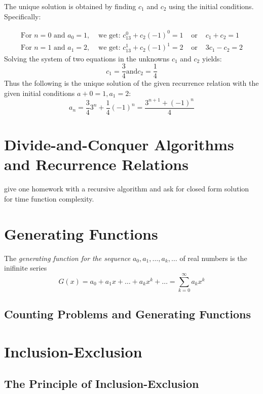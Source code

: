   The unique solution is obtained by finding $c_1$ and $c_2$ using the initial conditions. Specifically:
 
  \begin{align*}
  \text{For } n=0 \text{ and } a_0=1,  &\text{ we get: }  c_13^0+c_2(-1)^0=1   &\text{ or }  & c_1+c_2=1\\
  \text{For } n=1 \text{ and } a_1=2,  &\text{ we get: }  c_13^1+c_2(-1)^1=2   &\text{ or } & 3c_1-c_2=2
 \end{align*}  
 Solving the system of two equations in the unknowns $c_1$ and $c_2$ yields:
 \begin{displaymath}  
 c_1=\frac{3}{4} \text{and} c_2=\frac{1}{4}
 \end{displaymath}
 Thus the following is the unique solution of the given recurrence relation with the given initial conditions $a+0=1,a_1=2$:
 \begin{displaymath}
 a_n=\frac{3}{4} 3^n + \frac{1}{4} (-1)^n = \frac{3^{n+1}+(-1)^n}{4}
 \end{displaymath}

\section {Divide-and-Conquer Algorithms and Recurrence Relations}
give one homework with a recursive algorithm and ask for closed form solution for time function complexity.

\section {Generating Functions}

\begin{definition}
The \textit{generating function for the sequence} $a_0,a_1,\dots ,a_k, \dots$ of real numbers is the inifinite series
$$G(x)=a_0+a_1x+ \dots + a_kx^k+ \dots = \sum_{k=0}^\infty a_kx^k$$
\end{definition}

    \subsection {Counting Problems and Generating Functions}

\section {Inclusion-Exclusion}
  \subsection{The Principle of Inclusion-Exclusion}
